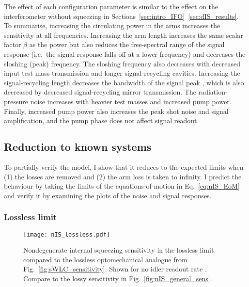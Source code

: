 The effect of each configuration parameter is similar to the effect on the interferometer without squeezing in Sections~\ref{sec:intro_IFO}~\ref{sec:dIS_results}. To summarise, increasing the circulating power in the arms increases the sensitivity at all frequencies. Increasing the arm length increases the same scalar factor $\beta$ as the power but also reduces the free-spectral range of the signal response (i.e.\ the signal response falls off at a lower frequency) and decreases the sloshing (peak) frequency. The sloshing frequency also decreases with decreased input test mass transmission and longer signal-recycling cavities. Increasing the signal-recycling length decreases the bandwidth of the signal peak , which is also decreased by decreased signal-recycling mirror transmission. The radiation-pressure noise increases with heavier test masses and increased pump power. Finally, increased pump power also increases the peak shot noise and signal amplification, and the pump phase does not affect signal readout. 


\subsection{Reduction to known systems}

To partially verify the model, I show that it reduces to the expected limits when (1) the losses are removed and (2) the arm loss is taken to infinity. I predict the behaviour by taking the limits of the equations-of-motion in Eq.~\ref{eq:nIS_EoM} and verify it by examining the plots of the noise and signal responses.

\subsubsection{Lossless limit}
\label{sec:nIS_lossless_limit}

\begin{figure}
	\centering
	\texttt{[image: nIS\_lossless.pdf]}
	\caption{ Nondegenerate internal squeezing sensitivity in the lossless limit compared to the lossless optomechanical analogue from Fig.~\ref{fig:sWLC_sensitivity}. Shown for no idler readout rate .  Compare to the lossy sensitivity in Fig.~\ref{fig:nIS_general_sens}.}
	\label{fig:nIS_lossless}
\end{figure}

